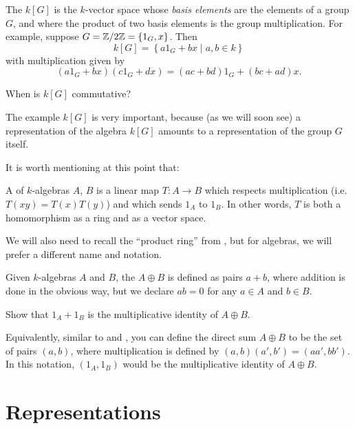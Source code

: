 \begin{example}
	The  $k[G]$ is the $k$-vector space
	whose \emph{basis elements} are the elements of a group $G$,
	and where the product of two basis elements is the group multiplication.
	For example, suppose $G = \mathbb Z/2\mathbb Z = \{1_G, x\}$.
	Then
	\[ k[G] = \left\{ a1_G + bx \mid a,b \in k \right\} \]
	with multiplication given by
	\[ (a1_G + bx)(c1_G+dx) = (ac+bd)1_G + (bc+ad)x. \]
\end{example}
\begin{ques}
	When is $k[G]$ commutative?
\end{ques}
The example $k[G]$ is very important,
because (as we will soon see) a representation of the algebra $k[G]$
amounts to a representation of the group $G$ itself.

It is worth mentioning at this point that:
\begin{definition}
	A  of $k$-algebras $A$, $B$ is a
	linear map $T \colon A \to B$ which respects multiplication
	(i.e.\ $T(xy) = T(x)T(y)$) and which sends $1_A$ to $1_B$.
	In other words, $T$ is both a homomorphism as a ring and as a vector space.
\end{definition}

We will also need to recall the ``product ring'' from ,
but for algebras, we will prefer a different name and notation.
\begin{definition}
	Given $k$-algebras $A$ and $B$, the  $A \oplus B$
	is defined as pairs $a + b$, where addition is done in the obvious way,
	but we declare $ab = 0$ for any $a \in A$ and $b \in B$.
\end{definition}
\begin{ques}
	Show that $1_A + 1_B$ is the multiplicative identity of $A \oplus B$.
\end{ques}
Equivalently, similar to  and ,
you can define the direct sum $A \oplus B$ to be the set of pairs $(a, b)$,
where multiplication is defined by $(a, b)(a', b')=(a a', b b')$.
In this notation, $(1_A, 1_B)$ would be the multiplicative identity of $A \oplus B$.

\section{Representations}

